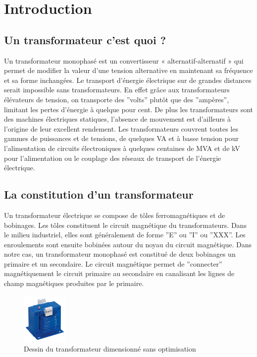 \section{Introduction}


\subsection{Un transformateur c'est quoi ? }

	Un transformateur monophasé est un convertisseur « alternatif-alternatif » qui permet de modifier la valeur d’une tension alternative en maintenant sa fréquence et sa forme inchangées. Le transport d'énergie électrique sur de grandes distances serait impossible sans transformateurs. En effet grâce aux transformateurs élévateurs de tension, on transporte des ''volts'' plutôt que des ''ampères'', limitant les pertes d’énergie à quelque pour cent. De plus les transformateurs sont des machines électriques statiques, l'absence de mouvement est d'ailleurs à l'origine de leur excellent rendement. Les transformateurs couvrent toutes les gammes de puissances et de tensions, de quelques VA et à basse tension pour l’alimentation de circuits électroniques à quelques centaines de MVA et de kV pour l’alimentation ou le couplage des réseaux de transport de l’énergie électrique. %

\subsection{La constitution d'un transformateur}

	Un transformateur électrique se compose de tôles ferromagnétiques et de bobinages. Les tôles constituent le circuit magnétique du transformateurs. Dans le milieu industriel, elles sont généralement de forme ''E'' ou ''I'' ou ''XXX''.
 Les enroulements sont ensuite bobinées autour du noyau du circuit magnétique. Dans notre cas, un transformateur monophasé est constitué de deux bobinages un primaire et un secondaire. 
Le circuit magnétique permet de ''connecter''  magnétiquement le circuit primaire au secondaire en canalisant les lignes de champ magnétiques produites par le primaire.

\begin{figure}
	\begin{center}
	\includegraphics[width=0.2\textwidth]{images/TP_intro_transfo}
	\caption{Dessin du transformateur dimensionné sans optimisation}\label{img:dessinTransfoCarre}
	\end{center}
\end{figure}


